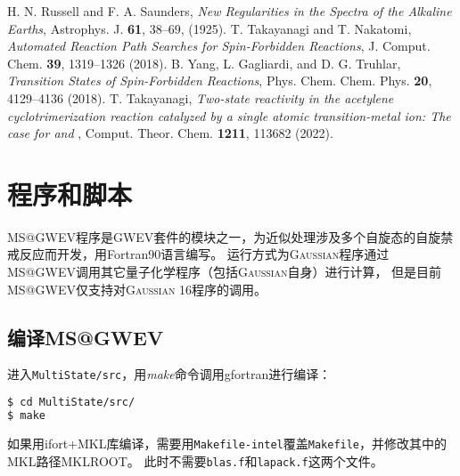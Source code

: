 \documentclass[UTF8]{ctexart}
\begin{document}
\noindent
\begin{thebibliography}{00}
 H. N. Russell and F. A. Saunders, \textit{New Regularities in the Spectra of the Alkaline Earths}, Astrophys. J. \textbf{61}, 38--69, (1925).
 T. Takayanagi and T. Nakatomi, \textit{Automated Reaction Path Searches for Spin-Forbidden Reactions}, J. Comput. Chem. \textbf{39}, 1319--1326 (2018).
 B. Yang, L. Gagliardi, and D. G. Truhlar, \textit{Transition States of Spin-Forbidden Reactions}, Phys. Chem. Chem. Phys. \textbf{20}, 4129--4136 (2018).
 T. Takayanagi, \textit{Two-state reactivity in the acetylene cyclotrimerization reaction catalyzed by a single atomic transition-metal ion: The case for  and },
Comput. Theor. Chem. \textbf{1211}, 113682 (2022).
\end{thebibliography}

\newpage

\section{程序和脚本}

MS@GWEV程序是\textsc{GWEV}套件的模块之一，为近似处理涉及多个自旋态的自旋禁戒反应而开发，用Fortran90语言编写。
运行方式为\textsc{Gaussian}程序通过MS@GWEV调用其它量子化学程序（包括\textsc{Gaussian}自身）进行计算，
但是目前MS@GWEV仅支持对\textsc{Gaussian} 16程序的调用。

\subsection{编译MS@GWEV}

进入\verb|MultiState/src|，用\textsl{make}命令调用\textsf{gfortran}进行编译：
\begin{lstlisting}[language=bash,numbers=none,backgroundcolor=\color{black},basicstyle=\tt\small\color{white},deletekeywords={cd}]
$ cd MultiState/src/
$ make
\end{lstlisting}

如果用\textsf{ifort}+\textsf{MKL}库编译，需要用\verb|Makefile-intel|覆盖\verb|Makefile|，并修改其中的MKL路径\textsf{MKLROOT}。
此时不需要\verb|blas.f|和\verb|lapack.f|这两个文件。
\end{document}
